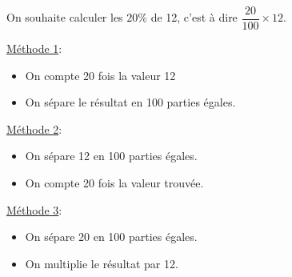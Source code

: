 \documentclass[a4paper]{book}
\begin{document}
    \begin{methode}
        On souhaite calculer les $20 \%$ de 12, c'est à dire $\dfrac{20}{100}\times12$.

        \medskip

        \begin{minipage}{0.32\linewidth}
            \underline{Méthode 1}:
            \begin{itemize}[leftmargin=*]
                \item On compte 20 fois la valeur 12
                \item On sépare le résultat en 100 parties égales.
            \end{itemize}

            \vspace{3cm}
        \end{minipage}
        \hfill\vline\hfill
        \begin{minipage}{0.32\linewidth}
            \underline{Méthode 2}:
            \begin{itemize}[leftmargin=*]
                \item On sépare 12 en 100 parties égales.
                \item On compte 20 fois la valeur trouvée.
            \end{itemize}

            \vspace{3cm}
        \end{minipage}
        \hfill\vline\hfill
        \begin{minipage}{0.32\linewidth}
            \underline{Méthode 3}:
            \begin{itemize}[leftmargin=*]
                \item On sépare 20 en 100 parties égales.
                \item On multiplie le résultat par 12.

            \end{itemize}

            \vspace{3cm}
        \end{minipage}
    \end{methode}
\end{document}
